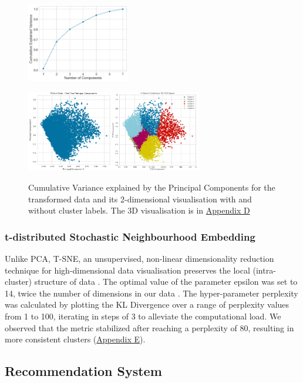 \documentclass{article}
\begin{document}
\begin{figure}[h]
\centering
\begin{minipage}{.35\textwidth}
  \centering
  \includegraphics[width=45mm]{Images/CUM VARIANCE.png}
  \label{fig:tdassS}
\end{minipage}%
\begin{minipage}{.65\textwidth}
  \centering
  \includegraphics[width=77mm]{Images/K-meansBeforeAfter.png}
  \label{fig:aDDF}
\end{minipage}
\caption{Cumulative Variance explained by the Principal Components for the transformed data and its 2-dimensional visualisation with and without cluster labels. The 3D visualisation is in \hyperref[app:kmeans_pca]{Appendix D}}
\end{figure}

\subsubsection{t-distributed Stochastic Neighbourhood Embedding}
 Unlike PCA, T-SNE, an unsupervised, non-linear dimensionality reduction technique for high-dimensional data visualisation preserves the local (intra-cluster) structure of data \cite{latex7e}. The optimal value of the parameter epsilon was set to 14, twice the number of dimensions in our data \cite{latex5e}. The hyper-parameter perplexity was calculated by plotting the KL Divergence  over a range of perplexity values from 1 to 100, iterating in steps of 3 to alleviate the computational load. We observed that the metric stabilized after reaching a perplexity of 80, resulting in more consistent clusters (\hyperref[app:TSNEPerp]{Appendix E}).

\subsection{Recommendation System}
\end{document}
